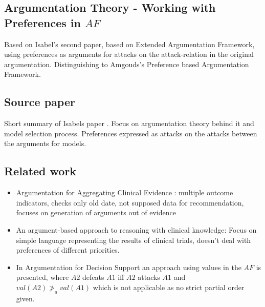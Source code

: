 \subsection{Argumentation Theory - Working with Preferences in $AF$}
Based on Isabel's second paper\cite{sassoon2016}, based on Extended Argumentation Framework\cite{Modgil2009}, using preferences as arguments for attacks on the attack-relation in the original argumentation.
Distinguishing to Amgouds's\cite{amgoud}  Preference based Argumentation Framework.

\subsection{Source paper}
Short summary of Isabels paper \cite{sassoon2014}. Focus on argumentation theory behind it and model selection process. Preferences expressed as attacks on the attacks between the arguments for models.

\subsection{Related work}
\begin{itemize}
	\item Argumentation for Aggregating Clinical Evidence \cite{hunter}: multiple outcome indicators, checks only old date, not supposed data for recommendation, focuses on generation of arguments out of evidence
	\item An argument-based approach to reasoning with clinical knowledge\cite{Gorogiannis20091}: Focus on simple language representing the results of clinical trials, doesn't deal with preferences of different priorities.
	\item In Argumentation for Decision Support\cite{Atkinson2006} an approach using values in the $AF$ is presented, where $A2$ defeats $A1$ iff $A2$ attacks $A1$ and $val(A2) \ngtr_a val(A1)$ which is not applicable as no strict partial order given.
\end{itemize}


